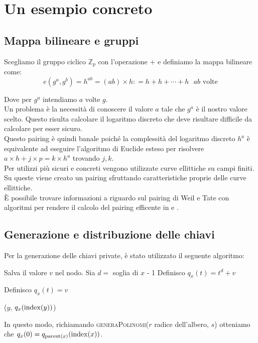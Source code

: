 \chapter{Un esempio concreto}

\section{Mappa bilineare e gruppi}

Scegliamo il gruppo ciclico $\mathbb{Z}_{p}$ con l'operazione $+$ e definiamo la mappa bilineare come:
\[ e(g^a,g^b) = h^{ab} = (ab) \times h : = h + h + \cdots + h \text{ $ab$ volte}\]

Dove per $g^a$ intendiamo $a$ volte $g$.\\


Un problema è la necessità di conoscere il valore $a$ tale che $g^a$ è il nostro valore scelto. Questo risulta calcolare il logaritmo discreto che deve risultare difficile da calcolare per esser sicuro.\\
Questo pairing è quindi banale poiché la complessità del logaritmo discreto $h^a$ è equivalente ad eseguire l'algoritmo di Euclide esteso per risolvere $a \times h + j \times p = k \times h^a$ trovando $j,k$.\\


Per utilizzi più sicuri e concreti vengono utilizzate curve ellittiche su campi finiti. Su queste viene creato un pairing sfruttando caratteristiche proprie delle curve ellittiche.\\
È possibile trovare informazioni a riguardo sul pairing di Weil e Tate con algoritmi per rendere il calcolo del pairing efficente in \cite{benoit} e \cite{maas}.


\section{Generazione e distribuzione delle chiavi}

Per la generazione delle chiavi private, è stato utilizzato il seguente algoritmo:
\vspace{0.3cm}
\begin{algorithmic}
   		\State Salva il valore $v$ nel nodo.
   \Else
   		\State Sia $d = $ soglia di $x$ - 1
   			\State Definisco $q_x(t) = t^d + v$ 

   		\Else
   			\State Definisco $q_x(t) = v$
   		
   		\EndIf

   			($y$, $q_x(\operatorname{index}(y))$) 
   		\EndFor
   \EndIf
\EndFunction
\end{algorithmic}
\vspace{0.3cm}
In questo modo, richiamando {\scshape generaPolinomi}($r$ radice dell'albero, $s$) otteniamo che $q_x(0) = q_{\operatorname{parent}(x)}(\operatorname{index}(x))$.\label{polinomi}\\[1cm]

